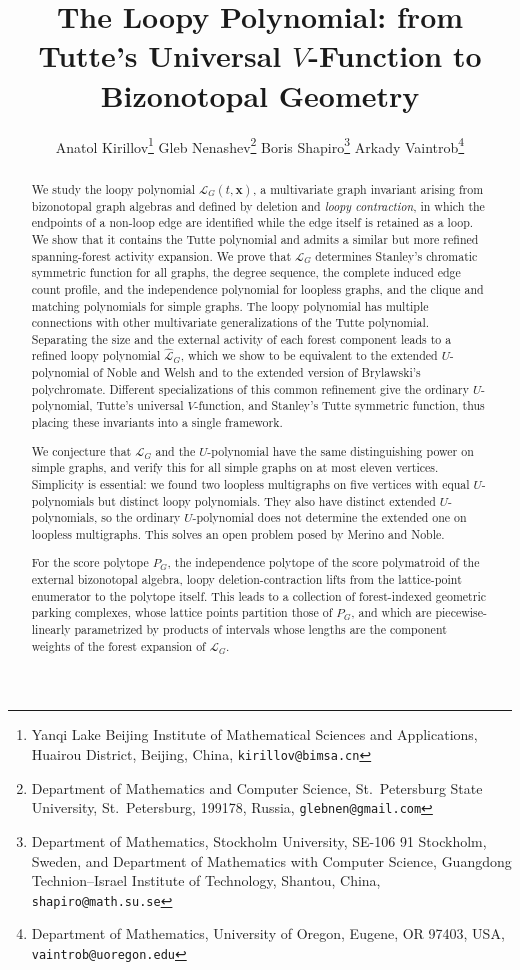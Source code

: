 \documentclass[11pt]{article}
\title{The Loopy Polynomial: from Tutte's Universal $V$-Function to Bizonotopal Geometry}
\author{
  Anatol Kirillov\thanks{Yanqi Lake Beijing Institute of Mathematical Sciences
    and Applications, Huairou District, Beijing, China,
    \texttt{kirillov@bimsa.cn}}
  \quad
  Gleb Nenashev\thanks{Department of Mathematics and Computer Science,
    St.~Petersburg State University, St.~Petersburg, 199178, Russia,
    \texttt{glebnen@gmail.com}}
  \quad
  Boris Shapiro\thanks{Department of Mathematics, Stockholm University,
    SE-106 91 Stockholm, Sweden, and Department of Mathematics with Computer
    Science, Guangdong Technion--Israel Institute of Technology, Shantou,
    China, \texttt{shapiro@math.su.se}}
  \quad
  Arkady Vaintrob\thanks{Department of Mathematics, University of Oregon,
    Eugene, OR 97403, USA, \texttt{vaintrob@uoregon.edu}}
}
\date{}
\theoremstyle{plain}
\theoremstyle{definition}
\renewcommand{\mathcal}{\mathscr}
\newcommand{\LL}{\mathcal{L}}    %
\newcommand{\bx}{\mathbf{x}}
\numberwithin{equation}{section}
\begin{document}
\maketitle
\begin{abstract}
We study the loopy polynomial $\LL_G(t,\bx)$, a multivariate graph invariant arising from bizonotopal graph algebras and defined by deletion and \emph{loopy contraction},
in which the endpoints of a non-loop edge are identified while the edge itself is retained as a loop.
We show that it contains the Tutte polynomial and admits a similar but more refined spanning-forest activity expansion.
We prove that $\LL_G$ determines Stanley's chromatic symmetric function for all graphs, the degree sequence, the complete induced edge count profile, and the independence polynomial for loopless graphs, and the clique and matching polynomials for simple graphs.
%
The loopy polynomial has multiple connections with other multivariate generalizations of the Tutte polynomial.
Separating the size and the external activity of each forest component leads to a refined loopy polynomial $\widehat{\LL}_G$,
which we show to be equivalent to the extended $U$-polynomial of Noble and Welsh and to the extended version of Brylawski's polychromate.
Different specializations of this common refinement give the ordinary $U$-polynomial, Tutte's universal $V$-function,
and Stanley's Tutte symmetric function, thus placing these invariants into a single framework.

We conjecture that $\LL_G$ and the $U$-polynomial have the same distinguishing power on simple graphs, and verify this for all simple graphs on at most eleven vertices.
Simplicity is essential: we found two loopless multigraphs on five vertices with equal $U$-polynomials but distinct loopy polynomials.
They also have distinct extended $U$-polynomials, so the ordinary $U$-polynomial does not determine the extended one on loopless multigraphs.  This solves an open problem posed by Merino and Noble.

For the score polytope $P_G$, the independence polytope of the score polymatroid of the external bizonotopal algebra, loopy deletion-contraction lifts from the lattice-point enumerator to the polytope itself.
This leads to a collection of forest-indexed geometric parking complexes, whose lattice points partition those of $P_G$, and which are piecewise-linearly parametrized by products of intervals whose lengths
are the component weights of the forest expansion of $\LL_G$.
\end{abstract}
\end{document}
